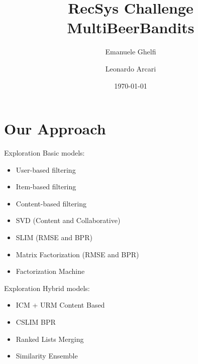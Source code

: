 \documentclass{beamer}
\title{ 
 RecSys Challenge \\ MultiBeerBandits
}
\date{\today}
\author{Emanuele Ghelfi \and Leonardo Arcari}
\institute{Politecnico di Milano}
\begin{document}
  \maketitle
  \section{Our Approach}
  \begin{frame}{Exploration}
    Basic models:
    		\begin{itemize}
    		\item User-based filtering
    		\item Item-based filtering
    		\item Content-based filtering
    		\item SVD (Content and Collaborative)
    		\item SLIM (RMSE and BPR)
    		\item Matrix Factorization (RMSE and BPR)
    		\item Factorization Machine
		\end{itemize}     
  \end{frame}
  \begin{frame}{Exploration}
    Hybrid models:
    		\begin{itemize}
    		\item ICM + URM Content Based
    		\item CSLIM BPR
    		\item Ranked Lists Merging
    		\item Similarity Ensemble
		\end{itemize}     
  \end{frame}
\end{document}
